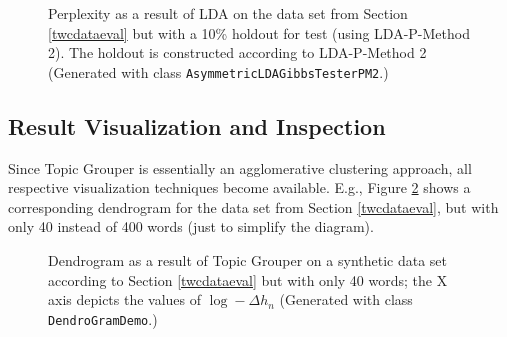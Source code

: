 \documentclass[10pt, a4paper, oneside]{article}
\begin{document}
\begin{figure}
\caption{Perplexity as a result of LDA on the data set from Section \ref{twcdataeval} but with a 10\% holdout for test (using LDA-P-Method 2). The holdout is constructed according to LDA-P-Method 2 (Generated with class \texttt{AsymmetricLDAGibbsTesterPM2}.)}
\label{perplexity4}
\end{figure}


\subsection{Result Visualization and Inspection}

Since Topic Grouper is essentially an agglomerative clustering approach, all respective visualization techniques become available.
E.g., Figure \ref{dendrogram} shows a corresponding dendrogram for the data set from Section \ref{twcdataeval}, but with only 40 instead of 400 words (just to simplify the diagram).
 
\begin{figure}
\caption{Dendrogram as a result of Topic Grouper on a synthetic data set according to Section \ref{twcdataeval} but with only 40 words; the X axis  depicts the values of $\log - \Delta h_{n}$ (Generated with class \texttt{DendroGramDemo}.)}
\label{dendrogram}
\end{figure}
\end{document}
